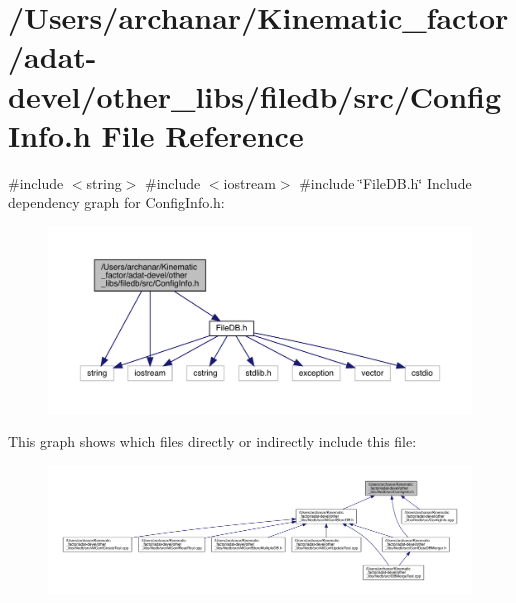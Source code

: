 \hypertarget{adat-devel_2other__libs_2filedb_2src_2ConfigInfo_8h}{}\section{/\+Users/archanar/\+Kinematic\+\_\+factor/adat-\/devel/other\+\_\+libs/filedb/src/\+Config\+Info.h File Reference}
\label{adat-devel_2other__libs_2filedb_2src_2ConfigInfo_8h}
{\ttfamily \#include $<$string$>$}\newline
{\ttfamily \#include $<$iostream$>$}\newline
{\ttfamily \#include \char`\"{}File\+D\+B.\+h\char`\"{}}\newline
Include dependency graph for Config\+Info.\+h\+:
\nopagebreak
\begin{figure}[H]
\begin{center}
\leavevmode
\includegraphics[width=350pt]{da/d5c/adat-devel_2other__libs_2filedb_2src_2ConfigInfo_8h__incl}
\end{center}
\end{figure}
This graph shows which files directly or indirectly include this file\+:
\nopagebreak
\begin{figure}[H]
\begin{center}
\leavevmode
\includegraphics[width=350pt]{dd/d26/adat-devel_2other__libs_2filedb_2src_2ConfigInfo_8h__dep__incl}
\end{center}
\end{figure}
